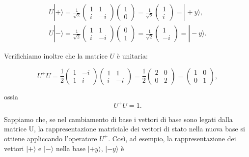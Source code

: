 \documentclass[a4paper,12pt,oneside]{book}
\begin{document}
\begin{equation}
\begin{array}{r}
U | + \rangle = \frac{1}{\sqrt{2}}
\begin{pmatrix}
1 & 1 \\
i & -i
\end{pmatrix}
\begin{pmatrix}
1\\
0
\end{pmatrix}=
\frac{1}{\sqrt{2}}
\begin{pmatrix}
1\\
i
\end{pmatrix}=
| +y \rangle , \\
U | - \rangle= \frac{1}{\sqrt{2}}
\begin{pmatrix}
1 & 1 \\
i & -i
\end{pmatrix}
\begin{pmatrix}
0\\
1
\end{pmatrix}=
\frac{1}{\sqrt{2}}
\begin{pmatrix}
1\\
-i
\end{pmatrix}=
| -y \rangle . 
\end{array}
\end{equation}

Verifichiamo inoltre che la matrice $U$ è unitaria:

\begin{equation}
U^+U = \frac{1}{2}
\begin{pmatrix}
1 & -i\\
1 & i
\end{pmatrix}
\begin{pmatrix}
1 & 1\\
i & -i
\end{pmatrix}=
\frac{1}{2}
\begin{pmatrix}
2 & 0\\
0 & 2
\end{pmatrix}=
\begin{pmatrix}
1 & 0\\
0 &1
\end{pmatrix} , 
\end{equation}

ossia
\begin{equation}
U^+U=1 . 
\end{equation}

Sappiamo che, se nel cambiamento di base i vettori di base sono legati dalla matrice U, la rappresentazione matriciale dei vettori di stato nella nuova base si ottiene appliccando l'operatore $U^+$. Così, ad esempio, la rappresentazione dei vettori $| + \rangle $ e $| - \rangle $ nella base  $| +y \rangle $, $| -y \rangle $ è
\end{document}
